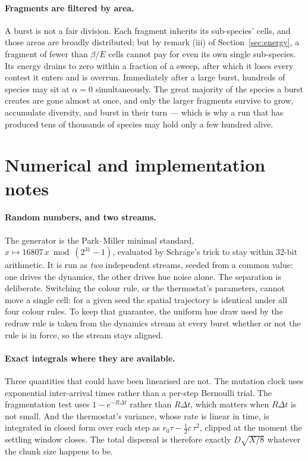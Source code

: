 \documentclass[11pt,a4paper]{article}
\newcommand{\dt}{\Delta t}
\begin{document}
\paragraph{Fragments are filtered by area.} A burst is not a fair division. Each fragment
inherits its sub-species' cells, and those areas are broadly distributed; but by remark
(iii) of Section~\ref{sec:energy}, a fragment of fewer than $\beta/E$ cells cannot pay for
even its own single sub-species. Its energy drains to zero within a fraction of a sweep,
after which it loses every contest it enters and is overrun. Immediately after a large
burst, hundreds of species may sit at $\alpha = 0$ simultaneously. The great majority of
the species a burst creates are gone almost at once, and only the larger fragments
survive to grow, accumulate diversity, and burst in their turn --- which is why a run
that has produced tens of thousands of species may hold only a few hundred alive.

\section{Numerical and implementation notes}
\label{sec:numerics}

\paragraph{Random numbers, and two streams.} The generator is the Park--Miller minimal
standard, $x \mapsto 16807\,x \bmod (2^{31}-1)$, evaluated by Schrage's trick to stay
within 32-bit arithmetic. It is run as \emph{two} independent streams, seeded from a
common value: one drives the dynamics, the other drives hue noise alone. The separation
is deliberate. Switching the colour rule, or the thermostat's parameters, cannot move a
single cell: for a given seed the spatial trajectory is identical under all four colour
rules. To keep that guarantee, the uniform hue draw used by the redraw rule is taken from
the dynamics stream at every burst whether or not the rule is in force, so the stream
stays aligned.

\paragraph{Exact integrals where they are available.} Three quantities that could have
been linearised are not. The mutation clock uses exponential inter-arrival times rather
than a per-step Bernoulli trial. The fragmentation test uses $1 - e^{-R\dt}$ rather than
$R\dt$, which matters when $R\dt$ is not small. And the thermostat's variance, whose rate
is linear in time, is integrated in closed form over each step as
$r_0 \tau - \tfrac12 c\,\tau^2$, clipped at the moment the settling window closes. The
total dispersal is therefore exactly $D\sqrt{X/8}$ whatever the chunk size happens to be.
\end{document}
